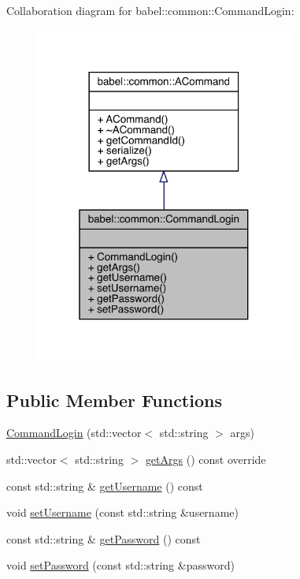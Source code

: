 Collaboration diagram for babel\+:\+:common\+:\+:Command\+Login\+:\nopagebreak
\begin{figure}[H]
\begin{center}
\leavevmode
\includegraphics[width=241pt]{classbabel_1_1common_1_1_command_login__coll__graph}
\end{center}
\end{figure}
\subsection*{Public Member Functions}
\begin{DoxyCompactItemize}
\item 
\mbox{\hyperlink{classbabel_1_1common_1_1_command_login_a261abfc20327043934deb7b494a7956d}{Command\+Login}} (std\+::vector$<$ std\+::string $>$ args)
\item 
std\+::vector$<$ std\+::string $>$ \mbox{\hyperlink{classbabel_1_1common_1_1_command_login_a34e71a8dc0447a276907444a7e6b2ae6}{get\+Args}} () const override
\item 
const std\+::string \& \mbox{\hyperlink{classbabel_1_1common_1_1_command_login_a0ea5fa301a69779ffdef3e2345595dff}{get\+Username}} () const
\item 
void \mbox{\hyperlink{classbabel_1_1common_1_1_command_login_a88f5f41f0152259bd1351f5c1121b853}{set\+Username}} (const std\+::string \&username)
\item 
const std\+::string \& \mbox{\hyperlink{classbabel_1_1common_1_1_command_login_a132103e213d41d4ec15585d473c1eb88}{get\+Password}} () const
\item 
void \mbox{\hyperlink{classbabel_1_1common_1_1_command_login_a969841e204d950d2cc344fb094937b6c}{set\+Password}} (const std\+::string \&password)
\end{DoxyCompactItemize}


